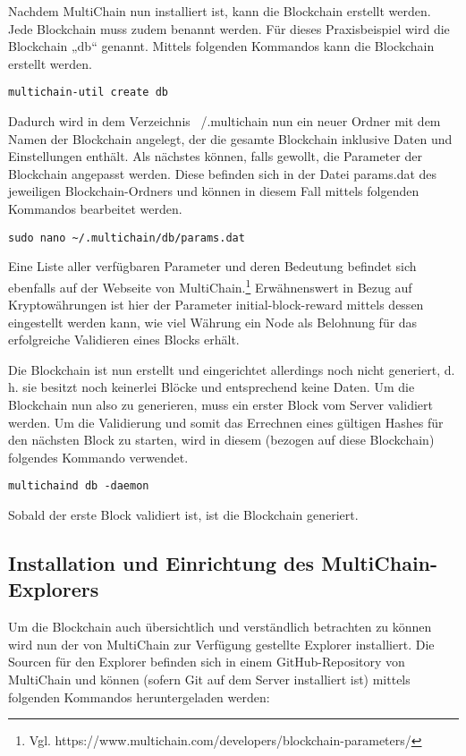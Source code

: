 Nachdem MultiChain nun installiert ist, kann die Blockchain erstellt werden. Jede Blockchain muss zudem benannt werden. Für dieses Praxisbeispiel wird die Blockchain „db“ genannt. Mittels folgenden Kommandos kann die Blockchain erstellt werden.

\begin{lstlisting}[frame=single]
multichain-util create db
\end{lstlisting}

Dadurch wird in dem Verzeichnis ~/.multichain nun ein neuer Ordner mit dem Namen der Blockchain angelegt, der die gesamte Blockchain inklusive Daten und Einstellungen enthält. Als nächstes können, falls gewollt, die Parameter der Blockchain angepasst werden. Diese befinden sich in der Datei params.dat des jeweiligen Blockchain-Ordners und können in diesem Fall mittels folgenden Kommandos bearbeitet werden.

\begin{lstlisting}[frame=single]
sudo nano ~/.multichain/db/params.dat
\end{lstlisting}

Eine Liste aller verfügbaren Parameter und deren Bedeutung befindet sich ebenfalls auf der Webseite von MultiChain.\footnote{Vgl. https://www.multichain.com/developers/blockchain-parameters/} Erwähnenswert in Bezug auf Kryptowährungen ist hier der Parameter initial-block-reward mittels dessen eingestellt werden kann, wie viel Währung ein Node als Belohnung für das erfolgreiche Validieren eines Blocks erhält.

Die Blockchain ist nun erstellt und eingerichtet allerdings noch nicht generiert, d. h. sie besitzt noch keinerlei Blöcke und entsprechend keine Daten. Um die Blockchain nun also zu generieren, muss ein erster Block vom Server validiert werden. Um die Validierung und somit das Errechnen eines gültigen Hashes für den nächsten Block zu starten, wird in diesem (bezogen auf diese Blockchain) folgendes Kommando verwendet.

\begin{lstlisting}[frame=single]
	multichaind db -daemon
\end{lstlisting}

Sobald der erste Block validiert ist, ist die Blockchain generiert.

\subsection{Installation und Einrichtung des MultiChain-Explorers}
\label{subsec:trans-erstellung}
Um die Blockchain auch übersichtlich und verständlich betrachten zu können wird nun der von MultiChain zur Verfügung gestellte Explorer installiert. Die Sourcen für den Explorer befinden sich in einem GitHub-Repository von MultiChain und können (sofern Git auf dem Server installiert ist) mittels folgenden Kommandos heruntergeladen werden:

